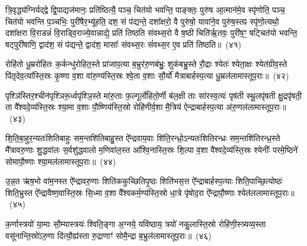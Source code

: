 त्रि॒वृद्ध्य॑ग्निर्यद्द्वे द्वि॒पाद्यज॑मानः॒ प्रति॑ष्ठित्यै॒ पञ्च॒ चित॑यो भवन्ति॒ पाङ्क्तः॒ पुरु॑ष आ॒त्मान॑मे॒व स्पृ॑णोति॒ पञ्च॒ चित॑यो भवन्ति प॒ञ्चभिः॒ पुरी॑षैर॒भ्यू॑हति॒ दश॒ सं प॑द्यन्ते॒ दशा᳚क्षरो॒ वै पुरु॑षो॒ यावा॑ने॒व पुरु॑ष॒स्तꣴ स्पृ॑णो॒त्यथो॒ दशा᳚क्षरा वि॒राडन्नं॑ वि॒राड्वि॒राज्ये॒वान्नाद्ये॒ प्रति॑ तिष्ठति संवथ्स॒रो वै ष॒ष्ठी चिति॑र्\mbox{}ऋ॒तवः॒ पुरी॑ष॒ꣳ॒ षट्चित॑यो भवन्ति॒ षट्पुरी॑षाणि॒ द्वाद॑श॒ सं प॑द्यन्ते॒ द्वाद॑श॒ मासाः᳚ संवथ्स॒रः सं॑वथ्स॒र ए॒व प्रति॑ तिष्ठति॥~(४१)

{\anuvakamend[{अव॒ चित॑यः॒ पुरी॑षं॒ पञ्च॑दश च}]}%

रोहि॑तो धू॒म्ररो॑हितः क॒र्कन्धु॑रोहित॒स्ते प्रा॑जाप॒त्या ब॒भ्रुर॑रु॒णब॑भ्रुः॒ शुक॑बभ्रु॒स्ते रौ॒द्राः श्येतः॑ श्येता॒क्षः श्येत॑ग्रीव॒स्ते पि॑तृदेव॒त्या᳚स्ति॒स्रः कृ॒ष्णा व॒शा वा॑रु॒ण्य॑स्ति॒स्रः श्वे॒ता व॒शाः सौ॒र्यो॑ मैत्राबार्\mbox{}हस्प॒त्या धू॒म्रल॑लामास्तूप॒राः॥~(४२)

{\anuvakamend[{}]}%

पृश्ञि॑स्तिर॒श्चीन॑पृश्ञिरू॒र्ध्वपृ॑श्ञि॒स्ते मा॑रु॒ताः फ॒ल्गूर्लो॑हितो॒र्णी ब॑ल॒क्षी ताः सा॑रस्व॒त्यः॑ पृष॑ती स्थू॒लपृ॑षती क्षु॒द्रपृ॑षती॒ ता वै᳚श्वदे॒व्य॑स्ति॒स्रः श्या॒मा व॒शाः पौ॒ष्णिय॑स्ति॒स्रो रोहि॑णीर्व॒शा मै॒त्रिय॑ ऐन्द्राबार्\mbox{}हस्प॒त्या अ॑रु॒णल॑लामास्तूप॒राः॥~(४३)

{\anuvakamend[{रोहि॑तः॒ पृश्ञिः॒ षड्विꣳ॑शतिः॒ षड्विꣳ॑शतिः}]}%

शि॒ति॒बा॒हुर॒न्यतः॑शितिबाहुः सम॒न्तशि॑तिबाहु॒स्त ऐ᳚न्द्रवाय॒वाः शि॑ति॒रन्ध्रो॒\-ऽन्यतः॑शितिरन्ध्रः सम॒न्तशि॑तिरन्ध्र॒स्ते मै᳚त्रावरु॒णाः शु॒द्धवा॑लः स॒र्वशु॑द्धवालो म॒णिवा॑ल॒स्त आ᳚श्वि॒नास्ति॒स्रः शि॒ल्पा व॒शा वै॑श्वदे॒व्य॑स्ति॒स्रः श्येनीः᳚ परमे॒ष्ठिने॑ सोमापौ॒ष्णाः श्या॒मल॑लामास्तूप॒राः॥~(४४)

{\anuvakamend[{}]}%

उ॒न्न॒त ऋ॑ष॒भो वा॑म॒नस्त ऐ᳚न्द्रावरु॒णाः शिति॑ककुच्छितिपृ॒ष्ठः शिति॑भस॒त्त ऐ᳚न्द्राबार्\mbox{}हस्प॒त्याः शिति॒पाच्छि॒त्योष्ठः॑ शिति॒भ्रुस्त ऐ᳚न्द्रावैष्ण॒वास्ति॒स्रः सि॒ध्मा व॒शा वै᳚श्वकर्म॒ण्य॑स्ति॒स्रो धा॒त्रे पृ॑षोद॒रा ऐ᳚न्द्रापौ॒ष्णाः श्येत॑ललामास्तूप॒राः॥~(४५)

{}%

क॒र्णास्त्रयो॑ या॒माः सौ॒म्यास्त्रयः॑ श्विति॒ङ्गा अ॒ग्नये॒ यवि॑ष्ठाय॒ त्रयो॑ नकु॒लास्ति॒स्रो रोहि॑णी॒स्त्र्यव्य॒स्ता वसू॑नान्ति॒स्रो॑\-ऽरु॒णा दि॑त्यौ॒ह्य॑स्ता रु॒द्राणाꣳ॑ सोमै॒न्द्रा ब॒भ्रुल॑लामास्तूप॒राः॥~(४६)

{\anuvakamend[{क॒र्णास्त्रयो॑विꣳशतिः}]}%

